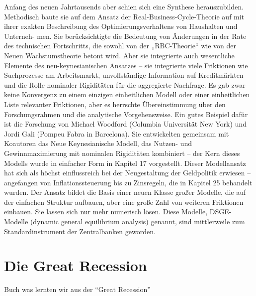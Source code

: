 Anfang des neuen Jahrtausends aber schien sich eine Synthese herauszubilden.
Methodisch baute sie auf dem Ansatz der Real-Business-Cycle-Theorie auf mit ihrer
exakten Beschreibung des Optimierungsverhaltens von Haushalten und Unterneh-
men. Sie berücksichtigte die Bedeutung von Änderungen in der Rate des technischen
Fortschritts, die sowohl von der „RBC-Theorie“ wie von der Neuen Wachstumstheorie
betont wird. Aber sie integrierte auch wesentliche Elemente des neu-keynesianischen
Ansatzes – sie integrierte viele Friktionen wie Suchprozesse am Arbeitsmarkt, unvollständige
Information auf Kreditmärkten und die Rolle nominaler Rigiditäten für die
aggregierte Nachfrage. Es gab zwar keine Konvergenz zu einem einzigen einheitlichen
Modell oder einer einheitlichen Liste relevanter Friktionen, aber es herrschte Übereinstimmung
über den Forschungsrahmen und die analytische Vorgehensweise.
Ein gutes Beispiel dafür ist die Forschung von Michael Woodford (Columbia Universität
New York) und Jordi Gali (Pompeu Fabra in Barcelona). Sie entwickelten gemeinsam
mit Koautoren das Neue Keynesianische Modell, das Nutzen- und Gewinnmaximierung
mit nominalen Rigiditäten kombiniert – der Kern dieses Modells wurde in
einfacher Form in Kapitel 17 vorgestellt. Dieser Modellansatz hat sich als höchst einflussreich
bei der Neugestaltung der Geldpolitik erwiesen – angefangen von Inflationssteuerung
bis zu Zinsregeln, die in Kapitel 25 behandelt wurden. Der Ansatz bildet die
Basis einer neuen Klasse großer Modelle, die auf der einfachen Struktur aufbauen, aber
eine große Zahl von weiteren Friktionen einbauen. Sie lassen sich nur mehr numerisch
lösen. Diese Modelle, DSGE-Modelle (dynamic general equilibrium analysis) genannt,
sind mittlerweile zum Standardinstrument der Zentralbanken geworden.


\section{Die Great Recession}

Buch was lernten wir aus der "`Great Recession"'

